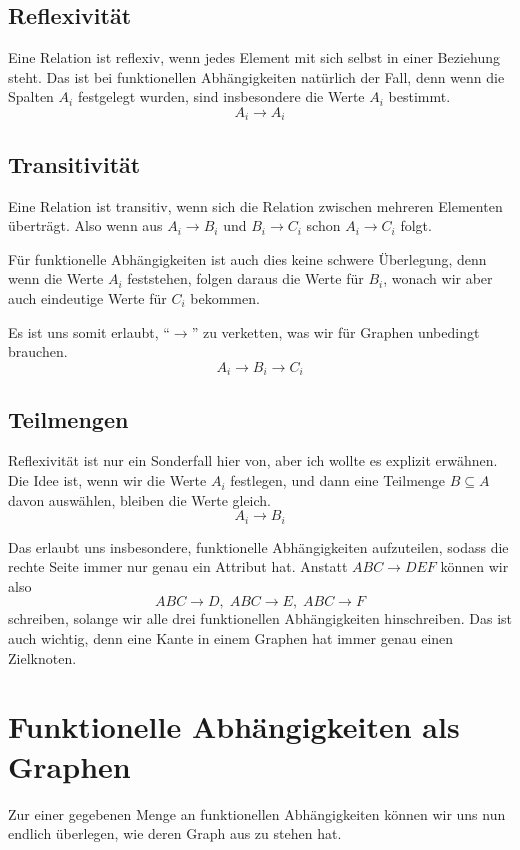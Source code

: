\documentclass[a4paper, ngerman]{article}
\begin{document}
\subsection*{Reflexivität}
Eine Relation ist reflexiv,
wenn jedes Element mit sich selbst in einer Beziehung steht.
Das ist bei funktionellen Abhängigkeiten natürlich der Fall,
denn wenn die Spalten $A_i$ festgelegt wurden,
sind insbesondere die Werte $A_i$ bestimmt.
$$
    A_i \to A_i
$$

\subsection*{Transitivität}
Eine Relation ist transitiv,
wenn sich die Relation zwischen mehreren Elementen überträgt.
Also wenn aus $A_i \to B_i$ und $B_i \to C_i$ schon $A_i \to C_i$ folgt.

Für funktionelle Abhängigkeiten ist auch dies keine schwere Überlegung,
denn wenn die Werte $A_i$ feststehen,
folgen daraus die Werte für $B_i$,
wonach wir aber auch eindeutige Werte für $C_i$ bekommen.

Es ist uns somit erlaubt,
\enquote{$\to$} zu verketten,
was wir für Graphen unbedingt brauchen.
$$
    A_i \to B_i \to C_i
$$

\subsection*{Teilmengen}
Reflexivität ist nur ein Sonderfall hier von,
aber ich wollte es explizit erwähnen.
Die Idee ist, wenn wir die Werte $A_i$ festlegen,
und dann eine Teilmenge $B \subseteq A$ davon auswählen,
bleiben die Werte gleich.
$$
    A_i \to B_i
$$

Das erlaubt uns insbesondere,
funktionelle Abhängigkeiten aufzuteilen,
sodass die rechte Seite
immer nur genau ein Attribut hat.
Anstatt $ABC \to DEF$ können wir also
$$
    ABC \to D,\;
    ABC \to E,\;
    ABC \to F
$$
schreiben, solange wir alle drei
funktionellen Abhängigkeiten hinschreiben.
Das ist auch wichtig, denn eine Kante
in einem Graphen hat immer genau einen Zielknoten.

\section*{Funktionelle Abhängigkeiten als Graphen}
Zur einer gegebenen Menge an funktionellen
Abhängigkeiten können
wir uns nun endlich überlegen,
wie deren Graph aus zu stehen hat.
\end{document}
